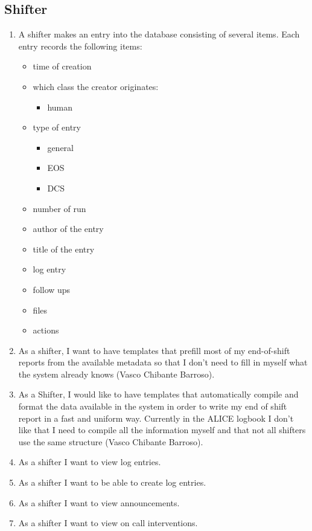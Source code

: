 \subsection{Shifter}
\begin{enumerate}
  \item A shifter makes an entry into the database consisting of several items. Each entry records the following items:
  \begin{itemize}
    \item time of creation
    \item which class the creator originates:
    \begin{itemize}
      \item human
    \end{itemize}
    \item type of entry
    \begin{itemize}
      \item general
      \item EOS
      \item DCS
    \end{itemize}
    \item number of run
    \item author of the entry
    \item title of the entry
    \item log entry
    \item follow ups
    \item files
    \item actions
  \end{itemize}
  \item As a shifter, I want to have templates that prefill most of my end-of-shift reports from the available metadata so that I don’t need to fill in myself what the system already knows (Vasco Chibante Barroso).
  \item As a Shifter, I would like to have templates that automatically compile and format the data available in the system in order to write my end of shift report in a fast and uniform way. Currently in the ALICE logbook I don't like that I need to compile all the information myself and that not all shifters use the same structure (Vasco Chibante Barroso).
  \item As a shifter I want to view log entries.
  \item As a shifter I want to be able to create log entries.
  \item As a shifter I want to view announcements.
  \item As a shifter I want to view on call interventions.

\end{enumerate}
